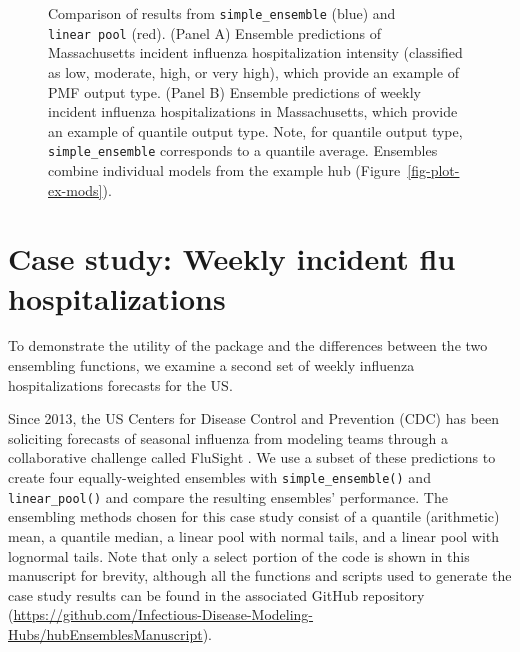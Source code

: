 \documentclass[
  article,
  shortnames,
  notitle]{jss}
\begin{document}
\begin{figure}


\caption{\label{fig-plot-ex-quantile-and-linear-pool}Comparison of
results from \texttt{simple\_ensemble} (blue) and \texttt{linear\ pool}
(red). (Panel A) Ensemble predictions of Massachusetts incident
influenza hospitalization intensity (classified as low, moderate, high,
or very high), which provide an example of PMF output type. (Panel B)
Ensemble predictions of weekly incident influenza hospitalizations in
Massachusetts, which provide an example of quantile output type. Note,
for quantile output type, \texttt{simple\_ensemble} corresponds to a
quantile average. Ensembles combine individual models from the example
hub (Figure~\ref{fig-plot-ex-mods}).}

\end{figure}%

\section{Case study: Weekly incident flu
hospitalizations}\label{sec-flu}

To demonstrate the utility of the  package and the
differences between the two ensembling functions, we examine a second
set of weekly influenza hospitalizations forecasts for the US.

Since 2013, the US Centers for Disease Control and Prevention (CDC) has
been soliciting forecasts of seasonal influenza from modeling teams
through a collaborative challenge called FluSight \citep{cdc_flusight}.
We use a subset of these predictions to create four equally-weighted
ensembles with \texttt{simple\_ensemble()} and \texttt{linear\_pool()}
and compare the resulting ensembles' performance. The ensembling methods
chosen for this case study consist of a quantile (arithmetic) mean, a
quantile median, a linear pool with normal tails, and a linear pool with
lognormal tails. Note that only a select portion of the code is shown in
this manuscript for brevity, although all the functions and scripts used
to generate the case study results can be found in the associated GitHub
repository
(\url{https://github.com/Infectious-Disease-Modeling-Hubs/hubEnsemblesManuscript}).
\end{document}
